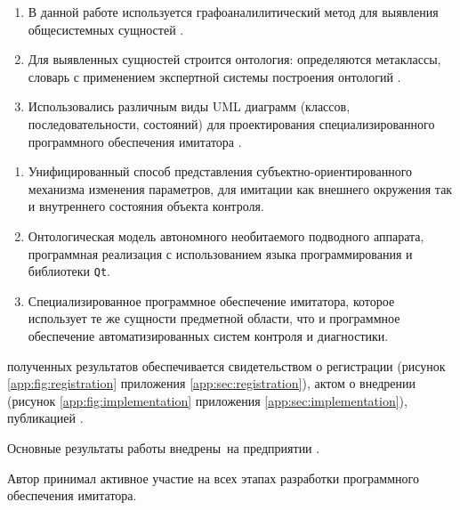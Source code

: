 {\methods}%
\begin{enumerate}
    \item В данной работе используется графоаналилитический метод для выявления общесистемных сущностей \cite{journal:vestnik_igeu:elizarova}.
    \item Для выявленных сущностей строится онтология: определяются метаклассы, словарь с применением экспертной системы построения онтологий \protege.
    \item Использовались различным виды UML диаграмм (классов, последовательности, состояний)
        для проектирования специализированного программного обеспечения имитатора \cite{book:oop:oop_analize}.
\end{enumerate}

{}
\begin{enumerate}
  \item Унифицированный способ представления субъектно-ориентированного механизма
        изменения параметров, для имитации как внешнего окружения так и внутреннего состояния объекта контроля.
  \item Онтологическая модель автономного необитаемого подводного аппарата,
        программная реализация с использованием языка программирования \cpp и библиотеки \texttt{Qt}.
  \item Специализированное программное обеспечение имитатора, которое использует
        те же сущности предметной области, что и программное обеспечение автоматизированных систем контроля и диагностики.
\end{enumerate}

{\reliability} полученных результатов обеспечивается
  свидетельством о регистрации (рисунок \ref{app:fig:registration} приложения \ref{app:sec:registration}),
  актом о внедрении (рисунок \ref{app:fig:implementation} приложения \ref{app:sec:implementation}),  
  публикацией \cite{bib:my:ttd_with_patterns_2019}.


{\probation} Основные результаты работы внедрены~на предприятии \leadingOrganizationTitle.

{\contribution} Автор принимал активное участие на всех этапах разработки программного обеспечения имитатора.
